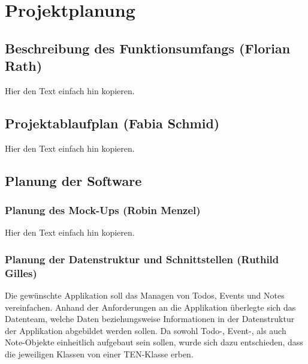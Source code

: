 \section{Projektplanung}
\label{instal}

\subsection{Beschreibung des Funktionsumfangs (Florian Rath)}

Hier den Text einfach hin kopieren.

\subsection{Projektablaufplan (Fabia Schmid)}

Hier den Text einfach hin kopieren.

\subsection{Planung der Software}

\subsubsection{Planung des Mock-Ups (Robin Menzel)}

Hier den Text einfach hin kopieren.

\newpage
\subsubsection{Planung der Datenstruktur und Schnittstellen (Ruthild Gilles)}

Die gewünschte Applikation soll das Managen von Todos, Events und Notes vereinfachen. Anhand der Anforderungen an die Applikation überlegte sich das Datenteam, welche Daten beziehungsweise Informationen in der Datenstruktur der Applikation abgebildet werden sollen. Da sowohl Todo-, Event-, als auch Note-Objekte einheitlich aufgebaut sein sollen, wurde sich dazu entschieden, dass die jeweiligen Klassen von einer TEN-Klasse erben.

